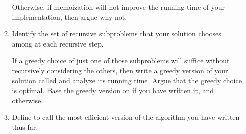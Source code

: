 \documentclass{article}
\begin{document}
\begin{enumerate}
\begin{enumerate}
      Otherwise, if memoization will not improve the running time of your
      implementation, then argue why not.

    \item Identify the set of recursive subproblems that your solution chooses
      among at each recursive step.

      If a greedy choice of just one of those subproblems will suffice without
      recursively considering the others, then write a greedy version of your
      solution called  and analyze its running time.
      Argue that the greedy choice is optimal.  Base the greedy version on
       if you have written it, and
       otherwise.

    \item Define  to call the most efficient version of the
      algorithm you have written thus far.

    \end{enumerate}

\end{enumerate}
\end{document}
